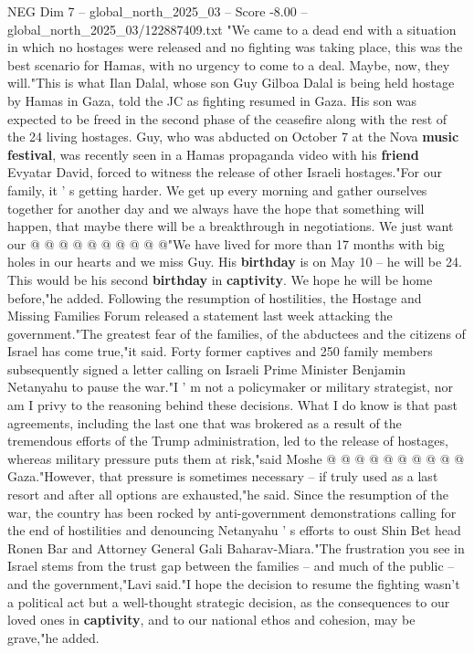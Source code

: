 \begin{textsample}{NEG Dim 7 – global\_north\_2025\_03 – Score -8.00 – global\_north\_2025\_03/122887409.txt}  \label{ex:f7_neg_125}
"We came to a dead end with a situation in which no hostages were released and no fighting was taking place, this was the best scenario for Hamas, with no urgency to come to a deal.
Maybe, now, they will."This is what Ilan Dalal, whose son Guy Gilboa Dalal is being held hostage by Hamas in Gaza, told the JC as fighting resumed in Gaza.
His son was expected to be freed in the second phase of the ceasefire along with the rest of the 24 living hostages.
Guy, who was abducted on October 7 at the Nova \textbf{music} \textbf{festival}, was recently seen in a Hamas propaganda video with his \textbf{friend} Evyatar David, forced to witness the release of other Israeli hostages."For our family, it ' s getting harder.
We get up every morning and gather ourselves together for another day and we always have the hope that something will happen, that maybe there will be a breakthrough in negotiations.
We just want our @ @ @ @ @ @ @ @ @ @"We have lived for more than 17 months with big holes in our hearts and we miss Guy.
His \textbf{birthday} is on May 10 -- he will be 24.
This would be his second \textbf{birthday} in \textbf{captivity}.
We hope he will be home before,"he added.
Following the resumption of hostilities, the Hostage and Missing Families Forum released a statement last week attacking the government."The greatest fear of the families, of the abductees and the citizens of Israel has come true,"it said.
Forty former captives and 250 family members subsequently signed a letter calling on Israeli Prime Minister Benjamin Netanyahu to pause the war."I ' m not a policymaker or military strategist, nor am I privy to the reasoning behind these decisions.
What I do know is that past agreements, including the last one that was brokered as a result of the tremendous efforts of the Trump administration, led to the release of hostages, whereas military pressure puts them at risk,"said Moshe @ @ @ @ @ @ @ @ @ @ Gaza."However, that pressure is sometimes necessary -- if truly used as a last resort and after all options are exhausted,"he said.
Since the resumption of the war, the country has been rocked by anti-government demonstrations calling for the end of hostilities and denouncing Netanyahu ' s efforts to oust Shin Bet head Ronen Bar and Attorney General Gali Baharav-Miara."The frustration you see in Israel stems from the trust gap between the families -- and much of the public -- and the government,"Lavi said."I hope the decision to resume the fighting wasn't a political act but a well-thought strategic decision, as the consequences to our loved ones in \textbf{captivity}, and to our national ethos and cohesion, may be grave,"he added.

\end{textsample}
